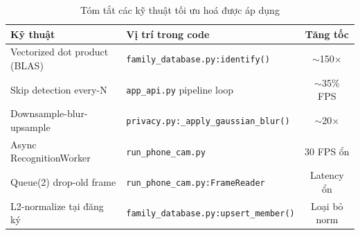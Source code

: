 \begin{table}[H]
\centering
\caption{Tóm tắt các kỹ thuật tối ưu hoá được áp dụng}
\label{tab:opt_summary}
{\small
\begin{tabularx}{\textwidth}{|l|X|c|}
\hline
\textbf{Kỹ thuật} & \textbf{Vị trí trong code} & \textbf{Tăng tốc} \\
\hline
Vectorized dot product (BLAS) & \texttt{family\_database.py:identify()} & $\sim$150$\times$ \\
Skip detection every-N & \texttt{app\_api.py} pipeline loop & $\sim$35\% FPS \\
Downsample-blur-upsample & \texttt{privacy.py:\_apply\_gaussian\_blur()} & $\sim$20$\times$ \\
Async RecognitionWorker & \texttt{run\_phone\_cam.py} & 30 FPS ổn \\
Queue(2) drop-old frame & \texttt{run\_phone\_cam.py:FrameReader} & Latency ổn \\
L2-normalize tại đăng ký & \texttt{family\_database.py:upsert\_member()} & Loại bỏ norm \\
\hline
\end{tabularx}
}
\end{table}
